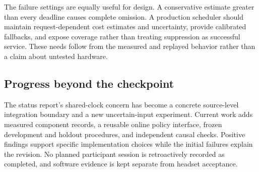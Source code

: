 The failure settings are equally useful for design. A conservative estimate greater than every deadline causes complete omission. A production scheduler should maintain request-dependent cost estimates and uncertainty, provide calibrated fallbacks, and expose coverage rather than treating suppression as successful service. These needs follow from the measured and replayed behavior rather than a claim about untested hardware.

\subsection{Progress beyond the checkpoint}
The status report's shared-clock concern has become a concrete source-level integration boundary and a new uncertain-input experiment. Current work adds measured component records, a reusable online policy interface, frozen development and holdout procedures, and independent causal checks. Positive findings support specific implementation choices while the initial failures explain the revision. No planned participant session is retroactively recorded as completed, and software evidence is kept separate from headset acceptance.
